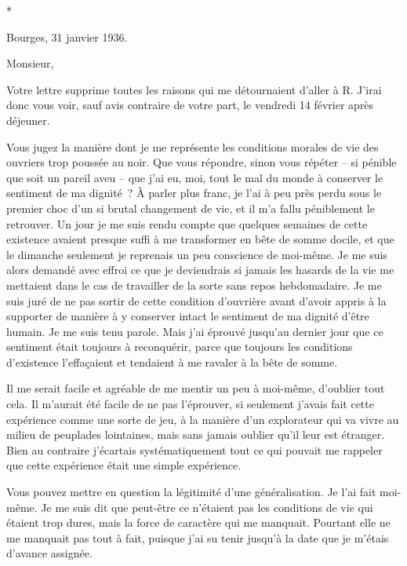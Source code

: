 \documentclass[french,twoside]{book} %
\begin{document}
\begin{center}
*\end{center}
\noindent \par
\noindent Bourges, 31 janvier 1936.\par
\noindent Monsieur,\par
Votre lettre supprime toutes les raisons qui me détournaient d'aller à R. J'irai donc vous voir, sauf avis contraire de votre part, le vendredi 14 février après déjeuner.\par
Vous jugez la manière dont je me représente les conditions morales de vie des ouvriers trop poussée au noir. Que vous répondre, sinon vous répéter – si pénible que soit un pareil aveu – que j'ai eu, moi, tout le mal du monde à conserver le sentiment de ma dignité ? À parler plus franc, je l'ai à peu près perdu sous le premier choc d'un si brutal changement de vie, et il m'a fallu péniblement le retrouver. Un jour je me suis rendu compte que quelques semaines de cette existence avaient presque suffi à me transformer en bête de somme docile, et que le dimanche seulement je reprenais un peu conscience de moi-même. Je me suis alors demandé avec effroi ce que je deviendrais si jamais les hasards de la vie me mettaient dans le cas de travailler de la sorte sans repos hebdomadaire. Je me suis juré de ne pas sortir de cette condition d'ouvrière avant d'avoir appris à la supporter de manière à y conserver intact le sentiment de ma dignité d'être humain. Je me suis tenu parole. Mais j'ai éprouvé jusqu'au dernier jour que ce sentiment était toujours à reconquérir, parce que toujours les conditions d'existence l'effaçaient et tendaient à me ravaler à la bête de somme.\par
Il me serait facile et agréable de me mentir un peu à moi-même, d'oublier tout cela. Il m'aurait été facile de ne pas l'éprouver, si seulement j’avais fait cette expérience comme une sorte de jeu, à la manière d'un explorateur qui va vivre au milieu de peuplades lointaines, mais sans jamais oublier qu'il leur est étranger. Bien au contraire j'écartais systématiquement tout ce qui pouvait me rappeler que cette expérience était une simple expérience.\par
Vous pouvez mettre en question la légitimité d'une généralisation. Je l'ai fait moi-même. Je me suis dit que peut-être ce n'étaient pas les conditions de vie qui étaient trop dures, mais la force de caractère qui me manquait. Pourtant elle ne me manquait pas tout à fait, puisque j'ai su tenir jusqu'à la date que je m'étais d'avance assignée.\par
\end{document}
